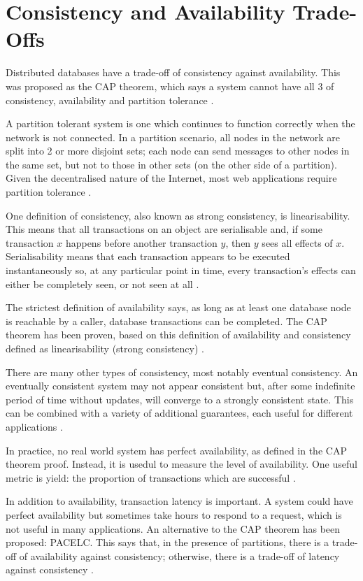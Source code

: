 \documentclass[12pt,a4paper,twoside,openany]{report}
\begin{document}
\section{Consistency and Availability Trade-Offs}

Distributed databases have a trade-off of consistency against availability. This was proposed as the CAP theorem, which says a system cannot have all 3 of consistency, availability and partition tolerance \cite{brewer}.

A partition tolerant system is one which continues to function correctly when the network is not connected. In a partition scenario, all nodes in the network are split into 2 or more disjoint sets; each node can send messages to other nodes in the same set, but not to those in other sets (on the other side of a partition). Given the decentralised nature of the Internet, most web applications require partition tolerance \cite{hale_2010}.

One definition of consistency, also known as strong consistency, is linearisability. This means that all transactions on an object are serialisable and, if some transaction $x$ happens before another transaction $y$, then $y$ sees all effects of $x$. Serialisability means that each transaction appears to be executed instantaneously so, at any particular point in time, every transaction's effects can either be completely seen, or not seen at all \cite{herlihy1990linearizability}.

The strictest definition of availability says, as long as at least one database node is reachable by a caller, database transactions can be completed. The CAP theorem has been proven, based on this definition of availability and consistency defined as linearisability (strong consistency) \cite{gilbert}.

There are many other types of consistency, most notably eventual consistency. An eventually consistent system may not appear consistent but, after some indefinite period of time without updates, will converge to a strongly consistent state. This can be combined with a variety of additional guarantees, each useful for different applications \cite{vogels_2008}.

In practice, no real world system has perfect availability, as defined in the CAP theorem proof. Instead, it is usedul to measure the level of availability. One useful metric is yield: the proportion of transactions which are successful \cite{fox1999harvest}.

In addition to availability, transaction latency is important. A system could have perfect availability but sometimes take hours to respond to a request, which is not useful in many applications. An alternative to the CAP theorem has been proposed: PACELC. This says that, in the presence of partitions, there is a trade-off of availability against consistency; otherwise, there is a trade-off of latency against consistency \cite{abadi2012consistency}.
\end{document}
